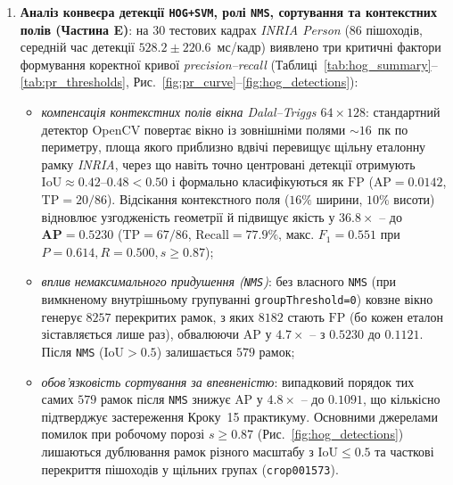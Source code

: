 \documentclass[14pt, a4paper]{extarticle}
\begin{document}
\begin{enumerate}
    \item \textbf{Аналіз конвеєра детекції \texttt{HOG+SVM}, ролі \texttt{NMS}, сортування та контекстних полів (Частина E)}: на 30 тестових кадрах \emph{INRIA Person} ($86$ пішоходів, середній час детекції $528.2 \pm 220.6$~мс/кадр) виявлено три критичні фактори формування коректної кривої \emph{precision--recall} (Таблиці~\ref{tab:hog_summary}--\ref{tab:pr_thresholds}, Рис.~\ref{fig:pr_curve}--\ref{fig:hog_detections}):
    \begin{itemize}
        \item \textit{компенсація контекстних полів вікна Dalal--Triggs $64 \times 128$}: стандартний детектор OpenCV повертає вікно із зовнішніми полями $\sim 16$~пк по периметру, площа якого приблизно вдвічі перевищує щільну еталонну рамку \emph{INRIA}, через що навіть точно центровані детекції отримують $\text{IoU} \approx 0.42$--$0.48 < 0.50$ і формально класифікуються як $\text{FP}$ ($\text{AP} = 0.0142$, $\text{TP} = 20/86$). Відсікання контекстного поля ($16\%$ ширини, $10\%$ висоти) відновлює узгодженість геометрії й підвищує якість у $36.8\times$ -- до $\mathbf{\text{AP} = 0.5230}$ ($\text{TP} = 67/86$, $\text{Recall} = 77.9\%$, макс. $F_1 = 0.551$ при $P = 0.614, R = 0.500, s \ge 0.87$);
        \item \textit{вплив немаксимального придушення (\texttt{NMS})}: без власного \texttt{NMS} (при вимкненому внутрішньому групуванні \texttt{groupThreshold=0}) ковзне вікно генерує $8257$ перекритих рамок, з яких $8182$ стають $\text{FP}$ (бо кожен еталон зіставляється лише раз), обвалюючи $\text{AP}$ у $4.7\times$ -- з $0.5230$ до $\mathbf{0.1121}$. Після \texttt{NMS} ($\text{IoU} > 0.5$) залишається $579$ рамок;
        \item \textit{обов'язковість сортування за впевненістю}: випадковий порядок тих самих $579$ рамок після \texttt{NMS} знижує $\text{AP}$ у $4.8\times$ -- до $\mathbf{0.1091}$, що кількісно підтверджує застереження Кроку~15 практикуму. Основними джерелами помилок при робочому порозі $s \ge 0.87$ (Рис.~\ref{fig:hog_detections}) лишаються дублювання рамок різного масштабу з $\text{IoU} \le 0.5$ та часткові перекриття пішоходів у щільних групах (\texttt{crop001573}).
    \end{itemize}
\end{enumerate}
\end{document}
